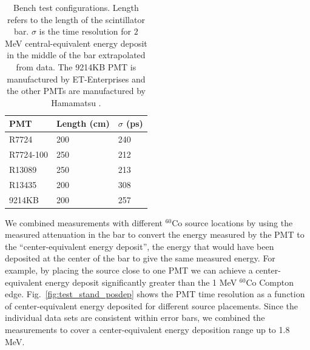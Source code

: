 \documentclass[3p,final,twocolumn]{elsarticle}
\begin{document}
\begin{table}[t!]
	\caption{Bench test configurations. Length refers to the length of the scintillator bar.  $\sigma$ is the time
          resolution for $2$ \si{\mega\electronvolt} central-equivalent energy deposit in the middle of the bar
          extrapolated from data.  The 9214KB PMT \cite{pmt9214} is manufactured by ET-Enterprises and the other PMTs are manufactured by Hamamatsu \cite{hamapmts}.}
    \centering
	\begin{tabular}{ m{5em}   m{3em}   m{3em} }
		\hline
			PMT & Length (cm) & $\sigma$ (\si{\pico\second})\\
		\hline\hline
			R7724 &  200 &  240		\\
			R7724-100 & 250 & 212 		\\
			R13089 & 250 & 213			\\			
			R13435 & 200 & 308 			\\		
			9214KB & 200 & 257			\\
		\hline
	\end{tabular}
	\label{tab:tests}
\end{table}

We combined measurements with different $^{60}$Co
source locations by using the measured attenuation in the bar to convert
the energy measured by the PMT to the ``center-equivalent energy
deposit'', the energy that would have been deposited at the center of
the bar to give the same measured energy.  For example, by placing the
source close to one PMT we can achieve a center-equivalent energy
deposit significantly greater than the 1 \si{\mega\electronvolt} $^{60}$Co Compton edge.
Fig.~\ref{fig:test_stand_posdep} shows the PMT time resolution as a
function of  center-equivalent energy deposited for different source placements. Since
the individual data sets are consistent within error bars, we combined
the measurements to cover a center-equivalent energy deposition range
up to 1.8 \si{\mega\electronvolt}.
\end{document}
